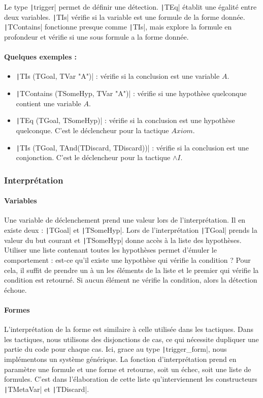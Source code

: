 \documentclass[french,titlepage]{article}
\begin{document}
Le type \texttt|trigger| permet de définir une détection. \texttt|TEq| établit une égalité entre deux variables. \texttt|TIs| vérifie si la variable est une formule de la forme donnée. \texttt|TContains| fonctionne presque comme \texttt|TIs|, mais explore la formule en profondeur et vérifie si une sous formule a la forme donnée.

\paragraph{Quelques exemples :}
\begin{itemize}
    \item \texttt|TIs (TGoal, TVar "A")| : vérifie si la conclusion est une variable $A$.
    \item \texttt|TContains (TSomeHyp, TVar "A")| : vérifie si une hypothèse quelconque contient une variable $A$.
    \item \texttt|TEq (TGoal, TSomeHyp)| : vérifie si la conclusion est une hypothèse quelconque. C'est le déclencheur pour la tactique $Axiom$.
    \item \texttt|TIs (TGoal, TAnd(TDiscard, TDiscard))| : vérifie si la conclusion est une conjonction. C'est le déclencheur pour la tactique $\land I$.
\end{itemize}

\subsubsection{Interprétation}

\paragraph{Variables}
Une variable de déclenchement prend une valeur lors de l'interprétation. Il en existe deux : \texttt|TGoal| et \texttt|TSomeHyp|. Lors de l'interprétation \texttt|TGoal| prends la valeur du but courant et \texttt|TSomeHyp| donne accès à la liste des hypothèses. Utiliser une liste contenant toutes les hypothèses permet d'émuler le comportement : est-ce qu'il existe une hypothèse qui vérifie la condition ? Pour cela, il suffit de prendre un à un les éléments de la liste et le premier qui vérifie la condition est retourné. Si aucun élément ne vérifie la condition, alors la détection échoue.

\paragraph{Formes}
L'interprétation de la forme est similaire à celle utilisée dans les tactiques. Dans les tactiques, nous utilisons des disjonctions de cas, ce qui nécessite dupliquer une partie du code pour chaque cas. Ici, grace au type \texttt|trigger_form|, nous implémentons un système générique. La fonction d'interprétation prend en paramètre une formule et une forme et retourne, soit un échec, soit une liste de formules. C'est dans l'élaboration de cette liste qu'interviennent les constructeurs \texttt|TMetaVar| et \texttt|TDiscard|.
\end{document}
